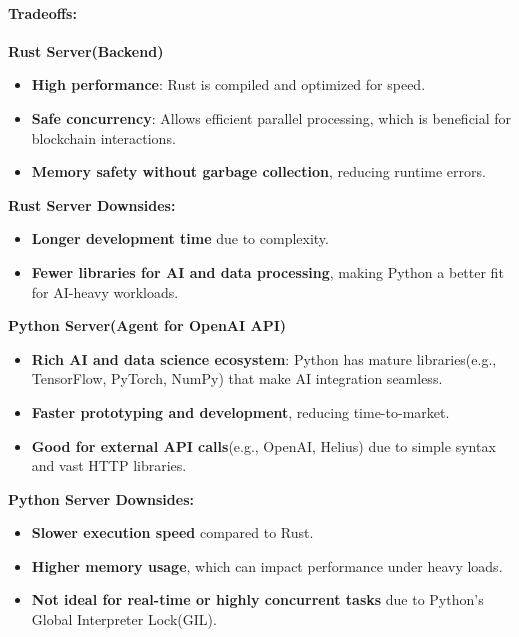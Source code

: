\documentclass[
]{article}
\providecommand{\tightlist}{%
  \setlength{\itemsep}{0pt}\setlength{\parskip}{0pt}}
\begin{document}
\hypertarget{tradeoffs-2}{%
\paragraph{\texorpdfstring{\textbf{Tradeoffs:}}{Tradeoffs:}}\label{tradeoffs-2}}

\textbf{Rust Server(Backend)}

\begin{itemize}
\tightlist
\item
  \textbf{High performance}: Rust is compiled and optimized for speed.
\item
  \textbf{Safe concurrency}: Allows efficient parallel processing, which
  is beneficial for blockchain interactions.
\item
  \textbf{Memory safety without garbage collection}, reducing runtime
  errors.
\end{itemize}

\textbf{Rust Server Downsides:}

\begin{itemize}
\tightlist
\item
  \textbf{Longer development time} due to complexity.
\item
  \textbf{Fewer libraries for AI and data processing}, making Python a
  better fit for AI-heavy workloads.
\end{itemize}

\textbf{Python Server(Agent for OpenAI API)}

\begin{itemize}
\tightlist
\item
  \textbf{Rich AI and data science ecosystem}: Python has mature
  libraries(e.g., TensorFlow, PyTorch, NumPy) that make AI integration
  seamless.
\item
  \textbf{Faster prototyping and development}, reducing time-to-market.
\item
  \textbf{Good for external API calls}(e.g., OpenAI, Helius) due to
  simple syntax and vast HTTP libraries.
\end{itemize}

\textbf{Python Server Downsides:}

\begin{itemize}
\tightlist
\item
  \textbf{Slower execution speed} compared to Rust.
\item
  \textbf{Higher memory usage}, which can impact performance under heavy
  loads.
\item
  \textbf{Not ideal for real-time or highly concurrent tasks} due to
  Python's Global Interpreter Lock(GIL).
\end{itemize}
\end{document}
